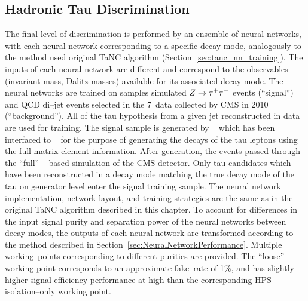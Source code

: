 \subsection{Hadronic Tau Discrimination}
%
The final level of discrimination is performed by an ensemble of neural
networks, with each neural network corresponding to a specific decay mode,
analogously to the method used original TaNC algorithm
(Section~\ref{sec:tanc_nn_training}).  The inputs of each neural network are
different and correspond to the observables (invariant mass, Dalitz masses)
available for its associated decay mode.  The neural networks are trained on
samples simulated $Z \to \tau^+\tau^-$ events (``signal'') and QCD di--jet events
selected in the 7~\TeV data collected by CMS in 2010 (``background'').  All of
the tau hypothesis from a given jet reconstructed in data are used for training.
The \ZTT signal sample is generated by \PYTHIA~\cite{pythia6_4} which has been
interfaced to \TAUOLA~\cite{tauola} for the purpose of generating the decays of
the tau leptons using the full matrix element information.  After generation,
the events passed through the ``full'' \GEANT~\cite{geant} based simulation of
the CMS detector.  Only tau candidates which have been reconstructed in a decay
mode matching the true decay mode of the tau on generator level enter the signal
training sample.  The neural network implementation, network layout, and
training strategies are the same as in the original TaNC algorithm described in
this chapter.  To account for differences in the input signal purity and
separation power of the neural networks between decay modes, the outputs of each
neural network are transformed according to the method described in
Section~\ref{sec:NeuralNetworkPerformance}.  Multiple working--points
corresponding to different purities are provided.  The ``loose'' working point
corresponds to an approximate fake--rate of 1\%, and has slightly higher signal
efficiency performance at high \pt than the corresponding HPS isolation--only
working point.

